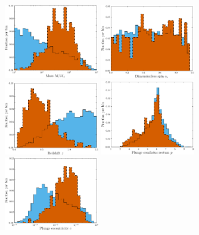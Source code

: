 \documentclass[aps,prd,amsfonts,amssymb,amsmath,nofootinbib,showpacs,superscriptaddress,twocolumn,floatfix]{revtex4-1}
\begin{document}
\begin{figure}
\centering
\includegraphics[width=0.37\textwidth]{Fig_res_pop_M} \quad
\includegraphics[width=0.37\textwidth]{Fig_res_pop_a} \\ \vspace{0.1cm}
\includegraphics[width=0.37\textwidth]{Fig_res_pop_z} \quad
\includegraphics[width=0.37\textwidth]{Fig_res_pop_p} \\ \vspace{0.1cm}
\includegraphics[width=0.37\textwidth]{Fig_res_pop_e} \quad

\end{figure}
\end{document}
